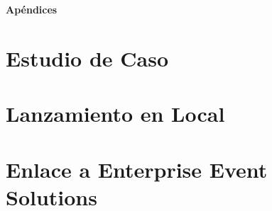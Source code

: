 \documentclass[12pt,twoside,titlepage]{report}
\newcommand\blankpage{%
    \newpage
    \null
    \thispagestyle{empty}%
    \newpage}
\begin{document}
\raggedbottom
\afterpage{\blankpage}

\newpage





\appendix

{}

\mbox{}
\vfill
\begin{center}
\begin{Huge}
\textbf{Apéndices}
\end{Huge}
\end{center}
\vfill
\mbox{}
\thispagestyle{empty}

\newpage
\mbox{}
\thispagestyle{empty}
\newpage


\chapter{Estudio de Caso}
\label{sec:apendice1}



\chapter{Lanzamiento en Local}
\label{sec:apendice2}



\chapter{Enlace a Enterprise Event Solutions}
\label{sec:apendice3}



\end{document}
